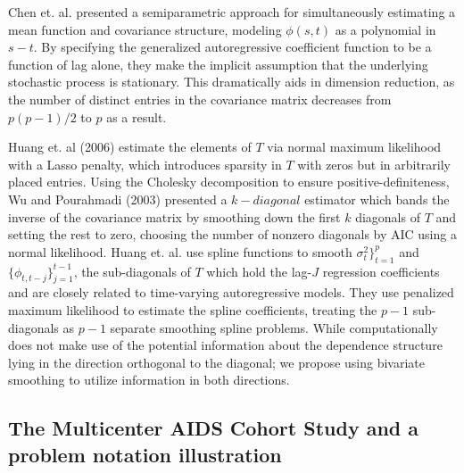 
Chen et. al. presented a semiparametric approach for simultaneously estimating a mean function and covariance structure, modeling $\phi\left(s,t\right)$ as a polynomial in $s-t$. By specifying the generalized autoregressive coefficient function to be a function of lag alone, they make the implicit assumption that the underlying stochastic process is stationary. This dramatically aids in dimension reduction, as the number of distinct entries in the covariance matrix decreases from $p\left(p-1\right)/2$ to $p$ as a result. 

Huang et. al (2006) estimate the elements of $T$ via normal maximum likelihood with a Lasso penalty, which introduces sparsity in $T$ with zeros but in arbitrarily placed entries. Using the Cholesky decomposition to ensure positive-definiteness, Wu and Pourahmadi (2003) presented a $k-diagonal$ estimator which bands the inverse of the covariance matrix by smoothing down the first $k$ diagonals of $T$ and setting the rest to zero, choosing the number of nonzero diagonals by AIC using a normal likelihood. Huang et. al. use spline functions to smooth $\sigma_t^2\rbrace_{t=1}^p$ and $\lbrace \phi_{t,t-j} \rbrace_{j=1}^{t-1}$, the sub-diagonals of $T$ which hold the lag-$J$ regression coefficients and are closely related to time-varying autoregressive models. They use penalized maximum likelihood to estimate the spline coefficients, treating the $p-1$ sub-diagonals as $p-1$ separate smoothing spline problems. While computationally  does not make use of the potential information about the dependence structure lying in the direction orthogonal to the diagonal; we propose using bivariate smoothing to utilize information in both directions.


\subsection{The Multicenter AIDS Cohort Study and a problem notation illustration}

